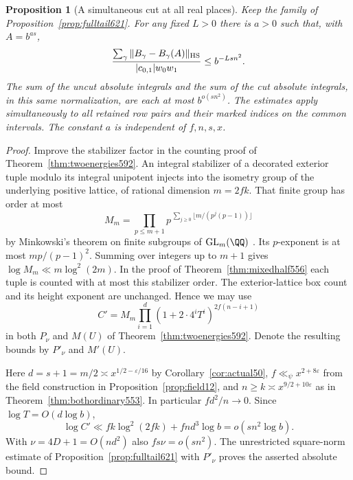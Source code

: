 \documentclass[a4paper,11pt]{article}
\newtheorem{proposition}{Proposition}[section]
\theoremstyle{definition}
\theoremstyle{remark}
\numberwithin{equation}{section}
\begin{document}
\begin{proposition}[A simultaneous cut at all real places]
\leavevmode\label{prop:powercut622}
Keep the family of Proposition~\ref{prop:fulltail621}. For any
fixed \(L>0\) there is \(a>0\) such that, with \(A=b^{as}\),
\[
 \frac{\sum_{\gamma}\|B_\gamma-B_\gamma(A)\|_{\rm HS}}
      {|c_{0,1}|w_0w_1}\le b^{-Lsn^2}.
\]
The sum of the uncut absolute integrals and the sum of the cut
absolute integrals, in this same normalization, are each at
most \(b^{o(sn^2)}\). The estimates apply simultaneously to
all retained row pairs and their marked indices on the common
intervals. The constant \(a\) is independent of \(f,n,s,x\).
\end{proposition}
\begin{proof}
Improve the stabilizer factor in the counting proof of
Theorem~\ref{thm:twoenergies592}. An integral stabilizer of a
decorated exterior tuple modulo its integral unipotent injects
into the isometry group of the underlying positive lattice,
of rational dimension \(m=2fk\). That finite group has order
at most
\[
         M_m=\prod_{p\le m+1}
          p^{\,\sum_{j\ge0}\lfloor m/(p^j(p-1))\rfloor}
\]
by Minkowski's theorem on finite subgroups of
\(\mathrm{GL}_m(\QQ)\)
\cite[Lecture I, Theorem 1]{XXII-XVII-IV-serre211}. Its \(p\)-exponent is
at most \(mp/(p-1)^2\). Summing over integers up to \(m+1\)
gives \(\log M_m\ll m\log^2(2m)\). In the proof of
Theorem~\ref{thm:mixedhalf556} each tuple is counted with at
most this stabilizer order. The exterior-lattice box count and
its height exponent are unchanged. Hence we may use
\[
 C' = M_m\prod_{i=1}^{d}(1+2\cdot4^i T^i)^{2f(n-i+1)}
\]
in both \(P_\nu\) and \(M(U)\) of
Theorem~\ref{thm:twoenergies592}. Denote the resulting bounds
by \(P'_\nu\) and \(M'(U)\).

Here \(d=s+1=m/2\asymp x^{1/2-\varepsilon/16}\) by
Corollary~\ref{cor:actual50},
\(f\ll_\psi x^{2+8\varepsilon}\) from the field construction
in Proposition~\ref{prop:field12}, and
\(n\ge k\asymp x^{9/2+10\varepsilon}\) as in
Theorem~\ref{thm:bothordinary553}. In particular
\(fd^2/n\to0\). Since \(\log T=O(d\log b)\),
\[
 \log C'\ll fk\log^2(2fk)+fnd^3\log b=o(sn^2\log b).
\]
With \(\nu=4D+1=O(nd^2)\) also \(fs\nu=o(sn^2)\).
The unrestricted square-norm estimate of
Proposition~\ref{prop:fulltail621} with \(P'_\nu\) proves the
asserted absolute bound.


\end{proof}
\end{document}
